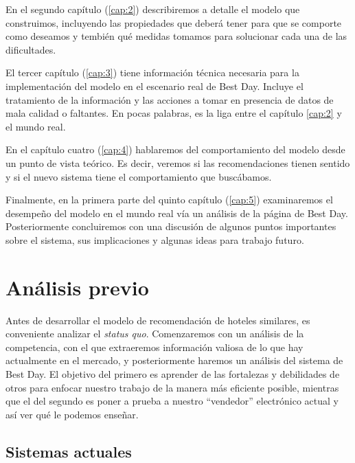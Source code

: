 \documentclass[12pt]{report}
\begin{document}
En el segundo capítulo (\ref{cap:2}) describiremos a detalle el modelo que construimos, incluyendo las propiedades que deberá tener para que se comporte como deseamos y tembién qué medidas tomamos para solucionar cada una de las dificultades.

El tercer capítulo (\ref{cap:3}) tiene información técnica necesaria para la implementación del modelo en el escenario real de Best Day. Incluye el tratamiento de la información y las acciones a tomar en presencia de datos de mala calidad o faltantes. En pocas palabras, es la liga entre el capítulo \ref{cap:2} y el mundo real.

En el capítulo cuatro (\ref{cap:4}) hablaremos del comportamiento del modelo desde un punto de vista teórico. Es decir, veremos si las recomendaciones tienen sentido y si el nuevo sistema tiene el comportamiento que buscábamos.

Finalmente, en la primera parte del quinto capítulo (\ref{cap:5}) examinaremos el desempeño del modelo en el mundo real vía un análisis de la página de Best Day. Posteriormente concluiremos con una discusión de algunos puntos importantes sobre el sistema, sus implicaciones y algunas ideas para trabajo futuro.

\chapter{Análisis previo} \label{cap:1}

Antes de desarrollar el modelo de recomendación de hoteles similares, es conveniente analizar el \emph{status quo}. Comenzaremos con un análisis de la competencia, con el que extraeremos información valiosa de lo que hay actualmente en el mercado, y posteriormente haremos un análisis del sistema de Best Day. El objetivo del primero es aprender de las fortalezas y debilidades de otros para enfocar nuestro trabajo de la manera más eficiente posible, mientras que el del segundo es poner a prueba a nuestro ``vendedor'' electrónico actual y así ver qué le podemos enseñar.

\section{Sistemas actuales}
\end{document}
